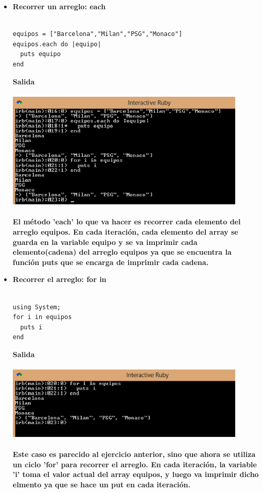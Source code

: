 \documentclass[11pt]{article} %
\begin{document}
\begin{itemize}
     \item  {\bf Recorrer un arreglo: each}\\\\
\begin{lstlisting}[frame=single]  % Start your code-block
equipos = ["Barcelona","Milan","PSG","Monaco"]
equipos.each do |equipo|
  puts equipo
end
\end{lstlisting}
\bf Salida\\\\
        \includegraphics[width=0.9\textwidth]{./imagenes/RecorrerArregloEach}\\\\
     El método 'each' lo que va hacer es recorrer cada elemento del arreglo equipos. En cada iteración, cada elemento del array se guarda en la variable equipo y se va imprimir cada elemento(cadena) del arreglo equipos ya que se encuentra la función puts que se encarga de imprimir cada cadena.\\

	

     \item {\bf Recorrer el arreglo: for in}\\\\
\begin{lstlisting}[frame=single]  % Start your code-block
using System;
for i in equipos
  puts i
end
\end{lstlisting}
\bf Salida\\\\
	    \includegraphics[width=0.9\textwidth]{./imagenes/RecorridoForin}\\\\
     Este caso es parecido al ejercicio anterior, sino que ahora se utiliza un ciclo 'for' para recorrer el arreglo. En cada iteración, la variable 'i' toma el valor actual del array equipos, y luego va imprimir dicho elmento ya que se hace un put en cada iteración.\\
\newpage


\end{itemize}
\end{document}
